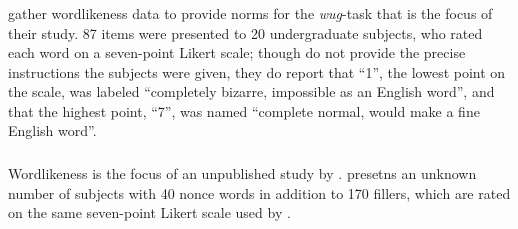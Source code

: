 
\subsubsection{\citealt{Albright2003b}}

\citet{Albright2003b} gather wordlikeness data to provide norms for the \emph{wug}-task that is the focus of their study. 87 items were presented to 20 undergraduate subjects, who rated each word on a seven-point Likert scale; though \citeauthor{Albright2003b} do not provide the precise instructions the subjects were given, they do report that ``1'', the lowest point on the scale, was labeled
``completely bizarre, impossible as an English word'', and that the highest point, ``7'', was named ``complete normal, would make a fine English word''. 

\subsubsection{\citet{Albright2007}}

Wordlikeness is the focus of an unpublished study by \citet{Albright2007}. \citeauthor{Albright2007} presetns an unknown number of subjects with 40 nonce words in addition to 170 fillers, which are rated on the same seven-point Likert scale used by \citet{Albright2003b}.
